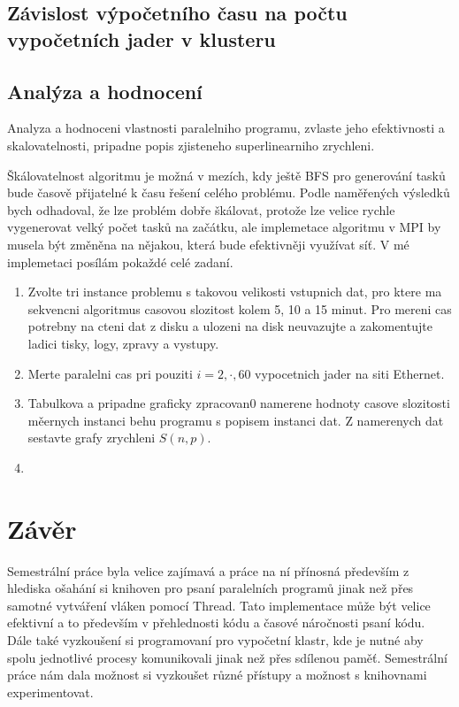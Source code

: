 \documentclass[epsf,epic,eepic,eepicemu]{article}
\begin{document}
\subsection{Závislost výpočetního času na počtu vypočetních jader v klusteru}
\subsection{Analýza a hodnocení}
Analyza a hodnoceni vlastnosti paralelniho programu, zvlaste jeho efektivnosti a skalovatelnosti, pripadne popis zjisteneho superlinearniho zrychleni.

Škálovatelnost algoritmu je možná v mezích, kdy ještě BFS pro generování tasků bude časově přijatelné k času řešení celého problému. Podle naměřených výsledků bych odhadoval, že lze problém dobře škálovat, protože lze velice rychle vygenerovat velký počet tasků na začátku, ale implemetace algoritmu v MPI by musela být změněna na nějakou, která bude efektivněji využívat síť. V mé implemetaci posílám pokaždé celé zadaní.

\begin{enumerate}
\item Zvolte tri instance problemu s takovou velikosti vstupnich dat, pro ktere ma sekvencni 
algoritmus casovou slozitost kolem 5, 10 a 15 minut.
Pro mereni cas potrebny na cteni dat z disku a ulozeni na disk neuvazujte a zakomentujte
ladici tisky, logy, zpravy a vystupy.
\item Merte paralelni cas pri pouziti $i=2,\cdot,60$ vypocetnich jader na siti Ethernet.
\item Tabulkova a pripadne graficky zpracovan0 namerene hodnoty casove slozitosti měernych instanci behu programu s popisem instanci dat. Z namerenych dat sestavte grafy zrychleni $S(n,p)$. 
\item 

\end{enumerate}

\section{Závěr}

Semestrální práce byla velice zajímavá a práce na ní přínosná především z hlediska ošahání si knihoven pro psaní paralelních programů jinak než přes samotné vytváření vláken pomocí Thread. Tato implementace může být velice efektivní a to především v přehlednosti kódu a časové náročnosti psaní kódu. Dále také vyzkoušení si programovaní pro vypočetní klastr, kde je nutné aby spolu jednotlivé procesy komunikovali jinak než přes sdílenou paměť. Semestrální práce nám dala možnost si vyzkoušet různé přístupy a možnost s knihovnami experimentovat.
\end{document}
